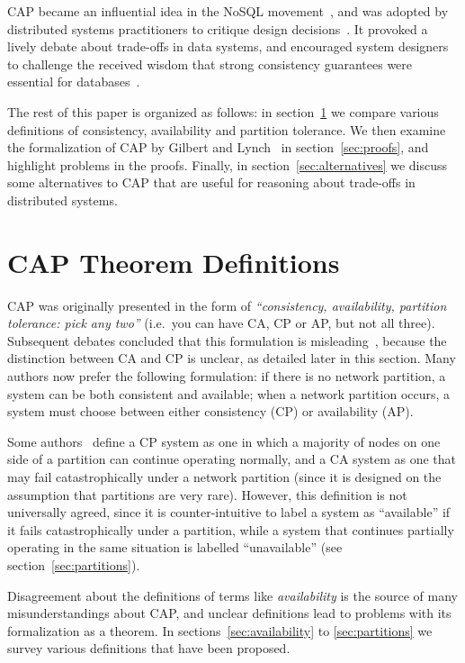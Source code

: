 \documentclass[a4paper,twocolumn,10pt]{article}
\begin{document}
CAP became an influential idea in the NoSQL movement~\cite{Vogels2008ey}, and was adopted by
distributed systems practitioners to critique design decisions~\cite{Hodges2013tj}. It provoked a
lively debate about trade-offs in data systems, and encouraged system designers to challenge the
received wisdom that strong consistency guarantees were essential for databases~\cite{Brewer2012ba}.

The rest of this paper is organized as follows: in section~\ref{sec:definitions} we compare various
definitions of consistency, availability and partition tolerance. We then examine the formalization
of CAP by Gilbert and Lynch~\cite{Gilbert2002il} in section~\ref{sec:proofs}, and highlight problems
in the proofs. Finally, in section~\ref{sec:alternatives} we discuss some alternatives to CAP that
are useful for reasoning about trade-offs in distributed systems.

\section{CAP Theorem Definitions}\label{sec:definitions}

CAP was originally presented in the form of \emph{``consistency, availability, partition tolerance:
pick any two''} (i.e.\ you can have CA, CP or AP, but not all three). Subsequent debates concluded
that this formulation is misleading~\cite{Brewer2012ba, Hale2010we, Robinson2010tp}, because the
distinction between CA and CP is unclear, as detailed later in this section. Many authors now prefer
the following formulation: if there is no network partition, a system can be both consistent and
available; when a network partition occurs, a system must choose between either consistency (CP) or
availability (AP).

Some authors~\cite{Darcy2010ta, Liochon2015vt} define a CP system as one in which a majority of
nodes on one side of a partition can continue operating normally, and a CA system as one that may
fail catastrophically under a network partition (since it is designed on the assumption that
partitions are very rare). However, this definition is not universally agreed, since it is
counter-intuitive to label a system as ``available'' if it fails catastrophically under a partition,
while a system that continues partially operating in the same situation is labelled ``unavailable''
(see section~\ref{sec:partitions}).

Disagreement about the definitions of terms like \emph{availability} is the source of many
misunderstandings about CAP, and unclear definitions lead to problems with its formalization as a
theorem. In sections~\ref{sec:availability} to \ref{sec:partitions} we survey various definitions
that have been proposed.
\end{document}
